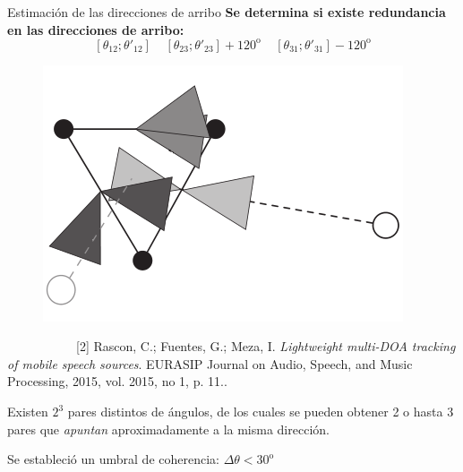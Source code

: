 \documentclass[12pt,aspectratio=169]{beamer}
\begin{document}
	\begin{frame}{Estimación de las direcciones de arribo}
		\textbf{Se determina si existe redundancia en las direcciones de arribo:}
		\begin{equation}
		\left[\theta_{12}; \theta'_{12}\right]~~~~~\left[\theta_{23}; \theta'_{23}\right]+120^{\mathrm{o}}~~~~~\left[\theta_{31}; \theta'_{31}\right]-120^{\mathrm{o}}
		\end{equation}		
		\hspace{5mm}
		\begin{minipage}{70mm}
			\begin{figure}[h]
				\centering
				\includegraphics[width=\linewidth]{figures/redundancia}
			\end{figure}
			\vspace{-8mm}
			~~~~~~~~~~~\tiny{[2] Rascon, C.; Fuentes, G.; Meza, I. \textit{Lightweight multi-DOA tracking of mobile speech sources}. EURASIP Journal on Audio, Speech, and Music Processing, 2015, vol. 2015, no 1, p. 11.}.
		\end{minipage}
	\hspace{5mm}
		\begin{minipage}{60mm}
			Existen $2^3$ pares distintos de ángulos, de los cuales se pueden obtener 2 o hasta 3 pares que \textit{apuntan} aproximadamente a la misma dirección.
			\vspace{5mm}	
		
			\pause
			
			Se estableció un umbral de coherencia: $\Delta \theta < 30^{\mathrm{o}}$
		\end{minipage}
	\end{frame}
\end{document}
